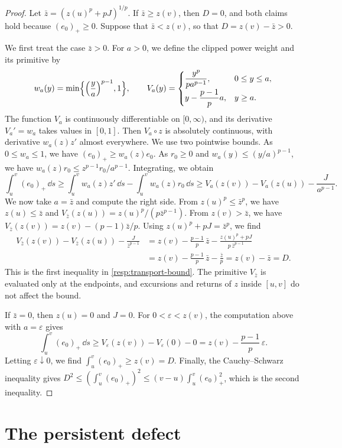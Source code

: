 \begin{proof}
Let $\bar z=(z(u)^p+pJ)^{1/p}$. If $\bar z\ge z(v)$, then $D=0$, and both claims hold because $(e_0)_+\ge0$. Suppose that $\bar z<z(v)$, so that $D=z(v)-\bar z>0$.

We first treat the case $\bar z>0$. For $a>0$, we define the clipped power weight and its primitive by
\[
 w_a(y)=\min\Bigl\{\Bigl(\frac ya\Bigr)^{p-1},1\Bigr\},
 \qquad
 V_a(y)=\begin{cases}
 \dfrac{y^p}{pa^{p-1}},&0\le y\le a,\\[2mm]
 y-\dfrac{p-1}pa,&y\ge a.
 \end{cases}
\]
The function $V_a$ is continuously differentiable on $[0,\infty)$, and its derivative $V_a'=w_a$ takes values in $[0,1]$. Then $V_a\circ z$ is absolutely continuous, with derivative $w_a(z)z'$ almost everywhere. We use two pointwise bounds. As $0\le w_a\le1$, we have $(e_0)_+\ge w_a(z)e_0$. As $r_0\ge0$ and $w_a(y)\le(y/a)^{p-1}$, we have $w_a(z)r_0\le z^{p-1}r_0/a^{p-1}$. Integrating, we obtain
\[
 \int_u^v(e_0)_+\,\dd s\ge\int_u^vw_a(z)z'\,\dd s-\int_u^vw_a(z)r_0\,\dd s
 \ge V_a(z(v))-V_a(z(u))-\frac J{a^{p-1}}.
\]
We now take $a=\bar z$ and compute the right side. From $z(u)^p\le\bar z^p$, we have $z(u)\le\bar z$ and $V_{\bar z}(z(u))=z(u)^p/(p\bar z^{p-1})$. From $z(v)>\bar z$, we have $V_{\bar z}(z(v))=z(v)-(p-1)\bar z/p$. Using $z(u)^p+pJ=\bar z^p$, we find
\[
\begin{aligned}
 V_{\bar z}(z(v))-V_{\bar z}(z(u))-\frac J{\bar z^{p-1}}
 &=z(v)-\frac{p-1}p\,\bar z-\frac{z(u)^p+pJ}{p\,\bar z^{p-1}}\\
 &=z(v)-\frac{p-1}p\,\bar z-\frac{\bar z}p=z(v)-\bar z=D.
\end{aligned}
\]
This is the first inequality in \eqref{resp:transport-bound}. The primitive $V_{\bar z}$ is evaluated only at the endpoints, and excursions and returns of $z$ inside $[u,v]$ do not affect the bound.

If $\bar z=0$, then $z(u)=0$ and $J=0$. For $0<\varepsilon<z(v)$, the computation above with $a=\varepsilon$ gives
\[
 \int_u^v(e_0)_+\,\dd s\ge V_\varepsilon(z(v))-V_\varepsilon(0)-0=z(v)-\frac{p-1}p\,\varepsilon.
\]
Letting $\varepsilon\downarrow0$, we find $\int_u^v(e_0)_+\ge z(v)=D$. Finally, the Cauchy--Schwarz inequality gives $D^2\le(\int_u^v(e_0)_+)^2\le(v-u)\int_u^v(e_0)_+^2$, which is the second inequality.
\end{proof}

\section{The persistent defect}\label{sec:viol-persistent}

